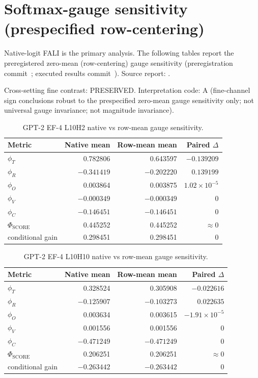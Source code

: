 \documentclass[preprint,12pt,authoryear]{elsarticle}
\begin{document}
\section{Softmax-gauge sensitivity (prespecified row-centering)}

Native-logit FALI is the primary analysis. The following tables report the
preregistered zero-mean (row-centering) gauge sensitivity (preregistration
commit~; executed results
commit~). Source report:
.

Cross-setting fine contrast: PRESERVED. Interpretation code: A
(fine-channel sign conclusions robust to the prespecified zero-mean gauge
sensitivity only; not universal gauge invariance; not magnitude invariance).

\begin{table}[h]
\centering
\caption{GPT-2 EF-4 L10H2 native vs row-mean gauge sensitivity.}
\begin{tabular}{lrrr}
\toprule
Metric & Native mean & Row-mean mean & Paired $\Delta$ \\
\midrule
$\phi_T$ & 0.782806 & 0.643597 & $-0.139209$ \\
$\phi_R$ & $-0.341419$ & $-0.202220$ & $0.139199$ \\
$\phi_O$ & 0.003864 & 0.003875 & $1.02\times10^{-5}$ \\
$\phi_V$ & $-0.000349$ & $-0.000349$ & $0$ \\
$\phi_C$ & $-0.146451$ & $-0.146451$ & $0$ \\
$\Phi_{\mathrm{SCORE}}$ & 0.445252 & 0.445252 & $\approx0$ \\
conditional gain & 0.298451 & 0.298451 & $0$ \\
\bottomrule
\end{tabular}
\end{table}

\begin{table}[h]
\centering
\caption{GPT-2 EF-4 L10H10 native vs row-mean gauge sensitivity.}
\begin{tabular}{lrrr}
\toprule
Metric & Native mean & Row-mean mean & Paired $\Delta$ \\
\midrule
$\phi_T$ & 0.328524 & 0.305908 & $-0.022616$ \\
$\phi_R$ & $-0.125907$ & $-0.103273$ & $0.022635$ \\
$\phi_O$ & 0.003634 & 0.003615 & $-1.91\times10^{-5}$ \\
$\phi_V$ & 0.001556 & 0.001556 & $0$ \\
$\phi_C$ & $-0.471249$ & $-0.471249$ & $0$ \\
$\Phi_{\mathrm{SCORE}}$ & 0.206251 & 0.206251 & $\approx0$ \\
conditional gain & $-0.263442$ & $-0.263442$ & $0$ \\
\bottomrule
\end{tabular}
\end{table}
\end{document}
